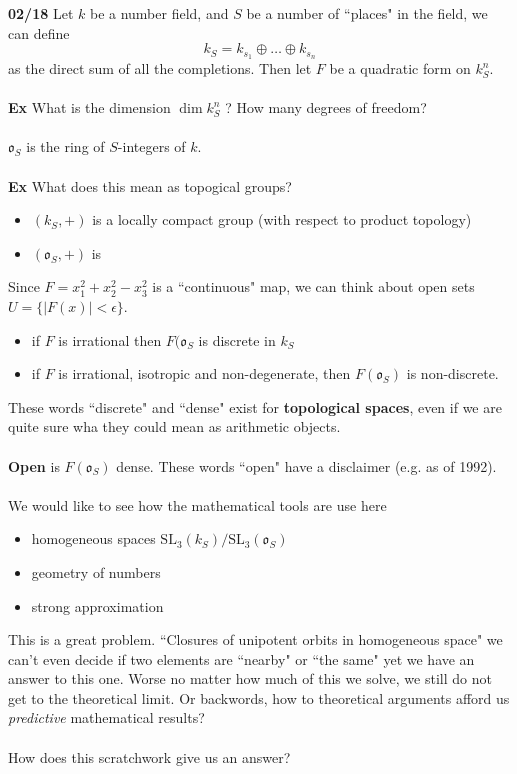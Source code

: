 \documentclass[12pt]{article}
\begin{document}
\newpage

\noindent \textbf{02/18} Let $k$ be a number field, and $S$ be a number of ``places" in the field, we can define 
$$ k_S = k_{s_1} \oplus \dots \oplus k_{s_n} $$
as the direct sum of all the completions.  Then let $F$ be a quadratic form on $k_S^n$.  \\ \\
\textbf{Ex} What is the dimension $\dim k_S^n$ ?  How many degrees of freedom? \\ \\
$\mathfrak{o}_S$ is the ring of $S$-integers of $k$.  \\ \\
\textbf{Ex}  What does this mean as topogical groups?
\begin{itemize}
\item $(k_S, +) $ is a locally compact group (with respect to product topology)
\item $(\mathfrak{o}_S, +)$ is 
\end{itemize}
Since $F = x_1^2 + x_2^2 - x_3^2$  is a ``continuous" map, we can think about open sets $U = \{ |F(x) |< \epsilon\} $.
\begin{itemize}
\item if $F$ is irrational then $F(\mathfrak{o}_S$ is discrete in $k_S$
\item if $F$ is irrational, isotropic and non-degenerate, then $F(\mathfrak{o}_S)$ is non-discrete.
\end{itemize}
These words ``discrete" and ``dense" exist for \textbf{topological spaces}, even if we are quite sure wha they could mean as arithmetic objects.  \\ \\
\textbf{Open} is $F(\mathfrak{o}_S)$ dense.  These words ``open" have a disclaimer (e.g. as of 1992).  \\ \\
We would like to see how the mathematical tools are use here
\begin{itemize}
\item homogeneous spaces $ \text{SL}_3(k_S)/ \text{SL}_3(\mathfrak{o}_S) $
\item geometry of numbers
\item strong approximation
\end{itemize}
This is a great problem.  ``Closures of unipotent orbits in homogeneous space" we can't even decide if two elements are ``nearby" or ``the same" yet we have an answer to this one.  Worse no matter how much of this we solve, we still do not get to the theoretical limit.  Or backwords, how to theoretical arguments afford us \textit{predictive} mathematical results? \\ \\
How does this scratchwork give us an answer?
\end{document}
